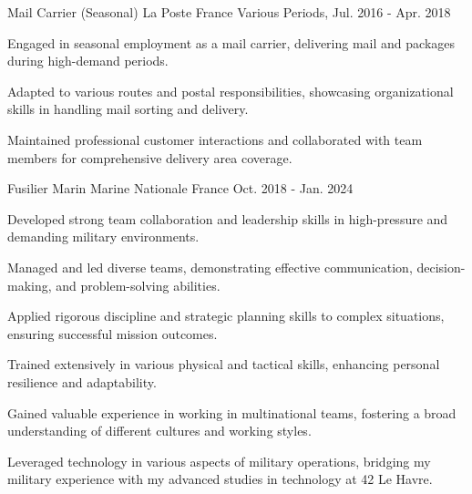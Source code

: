 

\begin{cventries}

\cventry
  {Mail Carrier (Seasonal)} %
  {La Poste} %
  {France} %
  {Various Periods, Jul. 2016 - Apr. 2018} %
  {
    \begin{cvitems} %
      \item {Engaged in seasonal employment as a mail carrier, delivering mail and packages during high-demand periods.}
      \item {Adapted to various routes and postal responsibilities, showcasing organizational skills in handling mail sorting and delivery.}
      \item {Maintained professional customer interactions and collaborated with team members for comprehensive delivery area coverage.}
    \end{cvitems}
  }

  \cventry
    {Fusilier Marin} %
    {Marine Nationale} %
    {France} %
    {Oct. 2018 - Jan. 2024} %
    {
      \begin{cvitems} %
        \item {Developed strong team collaboration and leadership skills in high-pressure and demanding military environments.}
        \item {Managed and led diverse teams, demonstrating effective communication, decision-making, and problem-solving abilities.}
        \item {Applied rigorous discipline and strategic planning skills to complex situations, ensuring successful mission outcomes.}
        \item {Trained extensively in various physical and tactical skills, enhancing personal resilience and adaptability.}
        \item {Gained valuable experience in working in multinational teams, fostering a broad understanding of different cultures and working styles.}
        \item {Leveraged technology in various aspects of military operations, bridging my military experience with my advanced studies in technology at 42 Le Havre.}
      \end{cvitems}
    }

\end{cventries}

